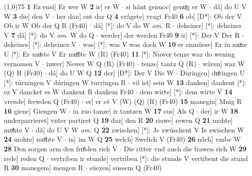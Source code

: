 \documentclass[8pt,a4paper,notitlepage]{article}
\begin{document}
\begin{table}[ht]
\begin{minipage}[t]{0.5\linewidth}
\line(1,0){75} \newline
\textbf{1} Ez ensî] Er wer W \textbf{2} ir] er W  $\cdot$ si hânt genuoc] genuͦg er W  $\cdot$ dâ] do U V W \textbf{3} die] den V  $\cdot$ her dan] ent dar Q \textbf{4} vrâgete] vragt Fr40 \textbf{6} ob] [D*]: Ob der V Ob ir W Ob der Q R (Fr40)  $\cdot$ dâ] [*]: do V do W \textit{om.} R  $\cdot$ dekeiner] [*]: deheiner V \textbf{7} dâ] [*]: do V \textit{om.} W do Q  $\cdot$ werder] der werden Fr40 \textbf{9} ir] [*]: Der V Der R  $\cdot$ dekeines] [*]: deheinez V  $\cdot$ was] [*]: was V was doch W \textbf{10} er enmüese] Er in muͦze U [*]: Er muͤste V Er muͦßte W (R) (Fr40) \textbf{11} [*]: Nuwer tenze waz do wening vernomen V  $\cdot$ iuwer] Newer W Q (R) (Fr40)  $\cdot$ tenze] tantz Q (R)  $\cdot$ wâren] waz W (Q) R (Fr40)  $\cdot$ dâ] do U W Q \textbf{12} der] [D*]: Der V Die W  $\cdot$ Duringen] duͦringen U [*]: túrningen V dúringen W turringen R  $\cdot$ vil ist] sein W \textbf{13} danken] dankent [*]: ez V dancket es W dankent R dankem Fr40  $\cdot$ dem wirte] [*]: dem wirte V \textbf{14} vreude] frewden Q (Fr40)  $\cdot$ er] er sv́ V (W) (Q) (R) (Fr40) \textbf{15} manegiu] Mnig R \textbf{16} gienc] Giengen W  $\cdot$ in zuo tanze] ir tantzen W \textbf{17} sus] Als Q  $\cdot$ der] ir W \textbf{18} underparrieret] vnter partiret Q \textbf{19} daz] den R \textbf{20} riuwe] rewen Q \textbf{21} mohte] moͤhte V  $\cdot$ dâ] do U V W \textit{om.} Q \textbf{22} zwischen] [*]: Je zwúschent V Ie zwischen W \textbf{24} mohte] moͤhte V  $\cdot$ in] im W Q \textbf{25} welch] Swelich V (Fr40) \textbf{26} nâch] vmbe W \textbf{28} Den sorgen arm den froͤiden rich V  $\cdot$ Die ritter vnd auch die frawen rich W \textbf{29} rede] reden Q  $\cdot$ vertriben ir stunde] vertriben [*]: die stunde V vertibent die stund R \textbf{30} manegem] mengen R  $\cdot$ süezen] sussem Q (Fr40) \newline
\end{minipage}
\end{table}
\end{document}
